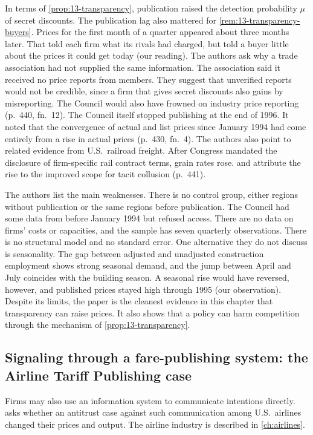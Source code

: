 In terms of \cref{prop:13-transparency}, publication raised the detection probability $\mu$ of secret discounts.
The publication lag also mattered for \cref{rem:13-transparency-buyers}. Prices for the first month of a quarter
appeared about three months later. That told each firm what its rivals had charged, but told a buyer little about
the prices it could get today (our reading). The authors ask why a trade association had not supplied the same
information. The association said it received no price reports from members. They suggest that unverified reports
would not be credible, since a firm that gives secret discounts also gains by misreporting. The Council would also
have frowned on industry price reporting (p.~440, fn.~12). The Council itself stopped publishing at the
end of 1996. It noted that the convergence of actual and list prices since January 1994 had come entirely from a
rise in actual prices (p.~430, fn.~4). The authors also point to related evidence from U.S.\ railroad freight.
After Congress mandated the disclosure of firm-specific rail contract terms, grain rates rose.
\citet{FullerRuppelBessler1990} and \citet{SchmitzFuller1995} attribute the rise to the improved scope for
tacit collusion (p.~441).

The authors list the main weaknesses. There is no control group, either regions without publication or the same
regions before publication. The Council had some data from before January 1994 but refused access. There are no
data on firms' costs or capacities, and the sample has seven quarterly observations. There is no structural model
and no standard error. One alternative they do not discuss is seasonality. The gap between adjusted and
unadjusted construction employment shows strong seasonal demand, and the jump between April and July coincides with the
building season. A seasonal rise would have reversed, however, and published prices stayed high through 1995
(our observation). Despite its limits, the paper is the cleanest evidence in this chapter that transparency can
raise prices. It also shows that a policy can harm competition through the mechanism of
\cref{prop:13-transparency}.

\subsection{Signaling through a fare-publishing system: the Airline Tariff Publishing case}\label{sec:13-atpco}

Firms may also use an information system to communicate intentions directly. \citet{Miller2010} asks whether an
antitrust case against such communication among U.S.\ airlines changed their prices and output. The airline
industry is described in \cref{ch:airlines}.

